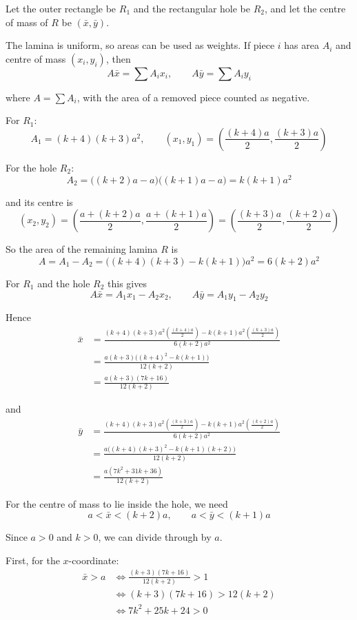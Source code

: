 \documentclass[leqno]{article}
\begin{document}
\begin{enumerate}[
  label=\textbf{\arabic*.},
  leftmargin=*,
  topsep=0pt,
  partopsep=0pt,
  parsep=0pt
]
\vspace*{10pt}

\begin{djsSolution}
Let the outer rectangle be $R_1$ and the rectangular hole be $R_2$, and let the centre of mass of $R$ be $(\bar x,\bar y)$.

The lamina is uniform, so areas can be used as weights. If piece $i$ has area $A_i$ and centre of mass $(x_i,y_i)$, then
\[
A\bar x=\sum A_ix_i,\qquad A\bar y=\sum A_iy_i
\]

where $A=\sum A_i$, with the area of a removed piece counted as negative.

For $R_1$:
\[
A_1=(k+4)(k+3)a^2,
\qquad
\left(x_1,y_1\right)=\left(\frac{(k+4)a}{2},\frac{(k+3)a}{2}\right)
\]

For the hole $R_2$:
\[
A_2=\bigl((k+2)a-a\bigr)\bigl((k+1)a-a\bigr)=k(k+1)a^2
\]

and its centre is
\[
\left(x_2,y_2\right)=\left(\frac{a+(k+2)a}{2},\frac{a+(k+1)a}{2}\right)=\left(\frac{(k+3)a}{2},\frac{(k+2)a}{2}\right)
\]

So the area of the remaining lamina $R$ is
\[
A=A_1-A_2=\bigl((k+4)(k+3)-k(k+1)\bigr)a^2=6(k+2)a^2
\]

For $R_1$ and the hole $R_2$ this gives
\[
A\bar x=A_1x_1-A_2x_2,
\qquad
A\bar y=A_1y_1-A_2y_2
\]

Hence
\begin{align*}
\bar x
&=\frac{(k+4)(k+3)a^2\left(\frac{(k+4)a}{2}\right)-k(k+1)a^2\left(\frac{(k+3)a}{2}\right)}{6(k+2)a^2}\\
&=\frac{a(k+3)\bigl((k+4)^2-k(k+1)\bigr)}{12(k+2)}\\
&=\frac{a(k+3)(7k+16)}{12(k+2)}
\end{align*}

and
\begin{align*}
\bar y
&=\frac{(k+4)(k+3)a^2\left(\frac{(k+3)a}{2}\right)-k(k+1)a^2\left(\frac{(k+2)a}{2}\right)}{6(k+2)a^2}\\
&=\frac{a\bigl((k+4)(k+3)^2-k(k+1)(k+2)\bigr)}{12(k+2)}\\
&=\frac{a(7k^2+31k+36)}{12(k+2)}
\end{align*}

For the centre of mass to lie inside the hole, we need
\[
a<\bar x<(k+2)a,
\qquad
a<\bar y<(k+1)a
\]

Since $a>0$ and $k>0$, we can divide through by $a$.

First, for the $x$-coordinate:
\begin{align*}
\bar x>a
&\iff \frac{(k+3)(7k+16)}{12(k+2)}>1\\
&\iff (k+3)(7k+16)>12(k+2)\\
&\iff 7k^2+25k+24>0
\end{align*}


\end{djsSolution}
\end{enumerate}
\end{document}

